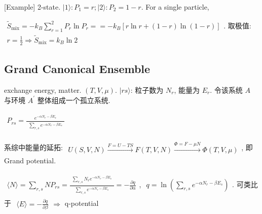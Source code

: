 \documentclass[../../main.tex]{subfiles}
\begin{document}
    [Example] 2-state. $|1\rangle: P_{1} = r; |2\rangle: P_{2} = 1 - r$. For a single particle, 
    
    $\begin{aligned}
        \widetilde{S}_{\text{mix}} = -k_{B}\sum_{r=1}^{2}P_{r}\ln{P_{r}} = = -k_{B}[r\ln{r} + (1-r)\ln{(1-r)}]
    \end{aligned}$. 取极值: $\begin{aligned}
        r= \frac{1}{2}\Rightarrow \widetilde{S}_{\text{mix}} = k_{B}\ln{2}
    \end{aligned}$


\subsection{Grand Canonical Ensemble}
exchange energy, matter. $(T,V,\mu)$. $|rs\rangle$: 粒子数为 $N_{r}$, 能量为 $E_{r}$. 令该系统 $A$ 与环境 $A^{\prime}$ 整体组成一个孤立系统. 

$\begin{aligned}
    P_{rs} = \frac{\begin{aligned}
        e^{-\alpha N_{r}-\beta E_{s}}
    \end{aligned}}{\begin{aligned}
        \sum_{r,s}e^{-\alpha N_{r} - \beta E_{s}}
    \end{aligned}}
\end{aligned}$

系综中能量的延拓: $\begin{aligned}
    U(S,V,N) \stackrel{F = U-TS}{\longrightarrow} F(T,V,N) \stackrel{\Phi = F-\mu N}{\longrightarrow} \Phi(T,V,\mu)
\end{aligned}$, 即 Grand potential. 

$\begin{aligned}
    \langle N\rangle = \sum_{r,s}NP_{rs} = \frac{\begin{aligned}
        \sum_{r,s}N_{r}e^{-\alpha N_{r}-\beta E_{s}}
    \end{aligned}}{\begin{aligned}
        \sum_{r,s}e^{-\alpha N_{r} - \beta E_{s}}
    \end{aligned}} = -\frac{\partial q}{\partial\alpha}
\end{aligned}$,  $\begin{aligned}
    q = \ln{\left(\sum_{r,s}e^{-\alpha N_{r} - \beta E_{s}}\right)}
\end{aligned}$.  可类比于 $\begin{aligned}
    \langle E\rangle = -\frac{\partial q}{\partial\beta}
\end{aligned}\Rightarrow$ q-potential
\end{document}
